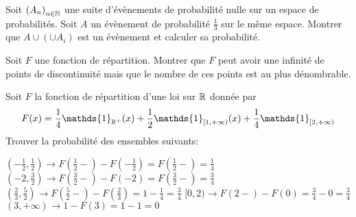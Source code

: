 \documentclass{report}
\begin{document}
\begin{exo}
    Soit \(\left(A_n\right)_{n\in\mathbb{N}}\) une suite d'évènements de probabilité
    nulle sur un espace de probabilités. Soit \(A\) un évènement de probabilité
    \(\frac13\) sur le même espace. Montrer que \(A\cup (\cup A_i)\) est un évènement
    et calculer sa probabilité.
\end{exo}

\begin{exo}
    Soit \(F\) une fonction de répartition. Montrer que \(F\) peut avoir une infinité
    de points de discontinuité mais que le nombre de ces points est au plus dénombrable.
\end{exo}

\begin{exo}
    Soit \(F\) la fonction de répartition d'une loi sur \(\mathbb{R}\) donnée par
    \[F(x)=\frac14\mathds{1}_{\R^+}(x)+
            \frac12\mathds{1}_{[1,+\infty)}(x)+
            \frac14\mathds{1}_{[2,+\infty)}\]
    Trouver la probabilité des ensembles suivants:
    \begin{enumerate}
        \itt \( (-\frac12,\frac12) \rightarrow F(\frac12-)-F(-\frac12) = F(\frac12-) = \frac14\)
        \itt \( (-2,\frac32) \rightarrow F(\frac32-) - F(-2) = F(\frac32-) = \frac34\)
        \itt \((\frac23,\frac52) \rightarrow F(\frac52-)-F(\frac23)= 1 - \frac14 = \frac34\)
        \itt \([0,2) \rightarrow F(2-)-F(0) = \frac34 - 0 = \frac34\)
        \itt \((3,+\infty) \rightarrow 1 - F(3) = 1-1=0\)
    \end{enumerate}
\end{exo}
\end{document}
